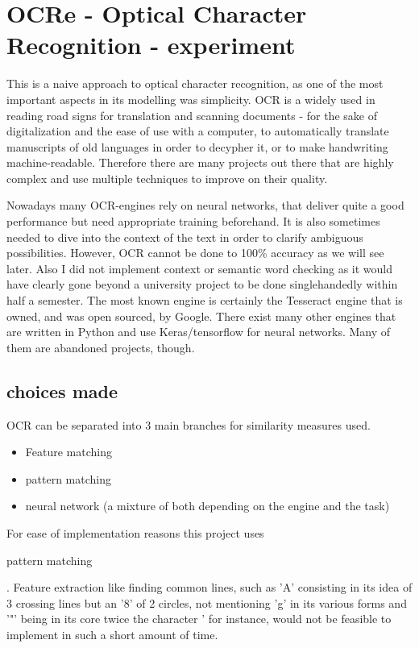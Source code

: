 




\section {OCRe - Optical Character Recognition - experiment}
This is a naive approach to optical character recognition, as one of the most important aspects in its modelling was simplicity. OCR is a widely used in reading road signs for translation and scanning documents - for the sake of digitalization and the ease of use with a computer, to automatically translate manuscripts of old languages in order to decypher it, or to make handwriting machine-readable. Therefore there are many projects out there that are highly complex and use multiple techniques to improve on their quality.

Nowadays many OCR-engines rely on neural networks, that deliver quite a good performance but need appropriate training beforehand. It is also sometimes needed to dive into the context of the text in order to clarify ambiguous possibilities. However, OCR cannot be done to 100\% accuracy as we will see later. Also I did not implement context or semantic word checking as it would have clearly gone beyond a university project to be done singlehandedly within half a semester.\newline
The most known engine is certainly the Tesseract engine that is owned, and was open sourced, by Google.\newline
There exist many other engines that are written in Python and use Keras/tensorflow for neural networks. Many of them are abandoned projects, though.


\subsection{choices made}
OCR can be separated into 3 main branches for similarity measures used.
\begin{itemize}
\item Feature matching
\item pattern matching
\item neural network (a mixture of both depending on the engine and the task)
\end{itemize}

For ease of implementation reasons this project uses \begin{bold} pattern matching \end{bold}.\endline
Feature extraction like finding common lines, such as 'A' consisting in its idea of 3 crossing lines but an '8' of 2 circles, not mentioning 'g' in its various forms and '"' being in its core twice the character ' for instance, would not be feasible to implement in such a short amount of time.

